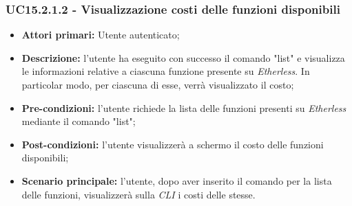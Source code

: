 \subsubsection{UC15.2.1.2 - Visualizzazione costi delle funzioni disponibili}
\begin{itemize}
	\item \textbf{Attori primari:} Utente autenticato;
	\item \textbf{Descrizione:} l'utente ha eseguito con successo il comando "list" e visualizza le informazioni relative a ciascuna funzione presente su \textit{Etherless}. In particolar modo, per ciascuna di esse, verrà visualizzato il costo;
	\item \textbf{Pre-condizioni:} l'utente richiede la lista delle funzioni presenti su \textit{Etherless} mediante il comando "list";
	\item \textbf{Post-condizioni:} l'utente visualizzerà a schermo il costo delle funzioni disponibili;
	\item \textbf{Scenario principale:} l'utente, dopo aver inserito il comando per la lista delle funzioni, visualizzerà sulla \textit{CLI\glo} i costi delle stesse.
\end{itemize}
